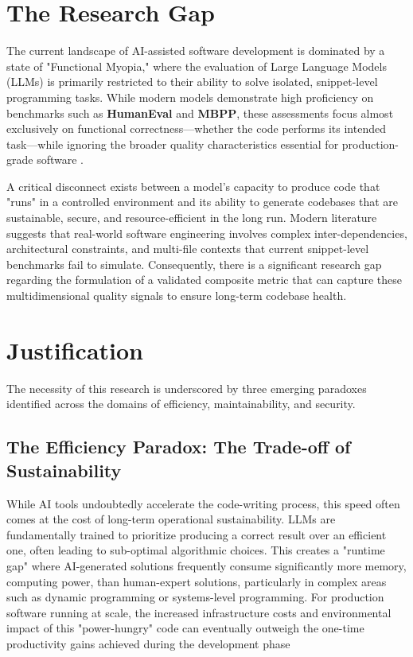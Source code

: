 \section{The Research Gap}

The current landscape of AI-assisted software development is dominated by a state of "Functional Myopia," where the evaluation of Large Language Models (LLMs) is primarily restricted to their ability to solve isolated, snippet-level programming tasks. While modern models demonstrate high proficiency on benchmarks such as \textbf{HumanEval} and \textbf{MBPP}, these assessments focus almost exclusively on functional correctness—whether the code performs its intended task—while ignoring the broader quality characteristics essential for production-grade software \parencite{liu2023codegeneratedchatgptreally}.

A critical disconnect exists between a model’s capacity to produce code that "runs" in a controlled environment and its ability to generate codebases that are sustainable, secure, and resource-efficient in the long run. Modern literature suggests that real-world software engineering involves complex inter-dependencies, architectural constraints, and multi-file contexts that current snippet-level benchmarks fail to simulate. Consequently, there is a significant research gap regarding the formulation of a validated composite metric that can capture these multidimensional quality signals to ensure long-term codebase health.

\section{Justification}

The necessity of this research is underscored by three emerging paradoxes identified across the domains of efficiency, maintainability, and security.

\subsection{The Efficiency Paradox: The Trade-off of Sustainability}

While AI tools undoubtedly accelerate the code-writing process, this speed often comes at the cost of long-term operational sustainability. LLMs are fundamentally trained to prioritize producing a correct result over an efficient one, often leading to sub-optimal algorithmic choices. This creates a "runtime gap" where AI-generated solutions frequently consume significantly more memory, computing power, than human-expert solutions, particularly in complex areas such as dynamic programming or systems-level programming. For production software running at scale, the increased infrastructure costs and environmental impact of this "power-hungry" code can eventually outweigh the one-time productivity gains achieved during the development phase

